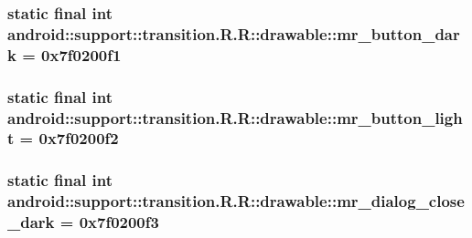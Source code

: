 \hypertarget{classandroid_1_1support_1_1transition_1_1_r_1_1drawable_b54865b2d6b8d5e70d7c43ac779d9bb0}{
\subsubsection[{mr\_\-button\_\-dark}]{\setlength{\rightskip}{0pt plus 5cm}static final int android::support::transition.R.R::drawable::mr\_\-button\_\-dark = 0x7f0200f1}}
\label{classandroid_1_1support_1_1transition_1_1_r_1_1drawable_b54865b2d6b8d5e70d7c43ac779d9bb0}


\hypertarget{classandroid_1_1support_1_1transition_1_1_r_1_1drawable_c331e11f75f097b080f64b8bf1ce783c}{
\subsubsection[{mr\_\-button\_\-light}]{\setlength{\rightskip}{0pt plus 5cm}static final int android::support::transition.R.R::drawable::mr\_\-button\_\-light = 0x7f0200f2}}
\label{classandroid_1_1support_1_1transition_1_1_r_1_1drawable_c331e11f75f097b080f64b8bf1ce783c}


\hypertarget{classandroid_1_1support_1_1transition_1_1_r_1_1drawable_2c4034f2fe5939a6123458c863be1cf5}{
\subsubsection[{mr\_\-dialog\_\-close\_\-dark}]{\setlength{\rightskip}{0pt plus 5cm}static final int android::support::transition.R.R::drawable::mr\_\-dialog\_\-close\_\-dark = 0x7f0200f3}}
\label{classandroid_1_1support_1_1transition_1_1_r_1_1drawable_2c4034f2fe5939a6123458c863be1cf5}


